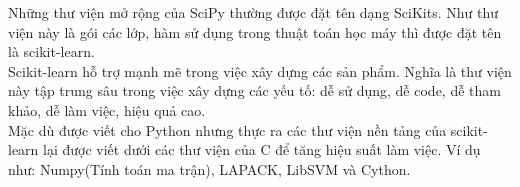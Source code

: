 Những thư viện mở rộng của SciPy thường được đặt tên dạng SciKits. Như thư viện này là gói các lớp, hàm sử dụng trong thuật toán học máy thì được đặt tên là scikit-learn.\\

Scikit-learn hỗ trợ mạnh mẽ trong việc xây dựng các sản phẩm. Nghĩa là thư viện này tập trung sâu trong việc xây dựng các yếu tố: dễ sử dụng, dễ code, dễ tham khảo, dễ làm việc, hiệu quả cao.\\

Mặc dù được viết cho Python nhưng thực ra các thư viện nền tảng của scikit-learn lại được viết dưới các thư viện của C để tăng hiệu suất làm việc. Ví dụ như: Numpy(Tính toán ma trận), LAPACK, LibSVM và Cython.

